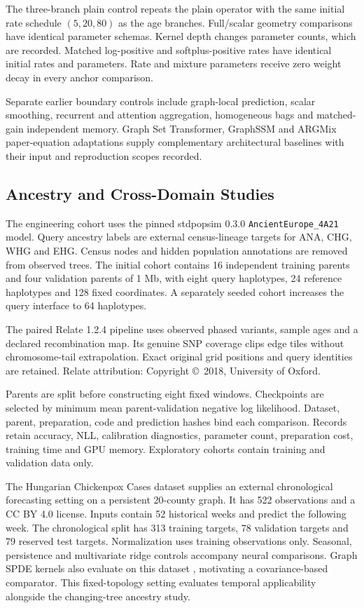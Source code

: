 \documentclass[letterpaper]{article}
\begin{document}
The three-branch plain control repeats the plain operator with the same initial rate schedule $(5,20,80)$ as the age branches. Full/scalar geometry comparisons have identical parameter schemas. Kernel depth changes parameter counts, which are recorded. Matched log-positive and softplus-positive rates have identical initial rates and parameters. Rate and mixture parameters receive zero weight decay in every anchor comparison.

Separate earlier boundary controls include graph-local prediction, scalar smoothing, recurrent and attention aggregation, homogeneous bags and matched-gain independent memory. Graph Set Transformer, GraphSSM and ARGMix paper-equation adaptations supply complementary architectural baselines with their input and reproduction scopes recorded.

\subsection{Ancestry and Cross-Domain Studies}
The engineering cohort uses the pinned stdpopsim 0.3.0 \texttt{AncientEurope\_4A21} model. Query ancestry labels are external census-lineage targets for ANA, CHG, WHG and EHG. Census nodes and hidden population annotations are removed from observed trees. The initial cohort contains 16 independent training parents and four validation parents of 1 Mb, with eight query haplotypes, 24 reference haplotypes and 128 fixed coordinates. A separately seeded cohort increases the query interface to 64 haplotypes.

The paired Relate 1.2.4 pipeline uses observed phased variants, sample ages and a declared recombination map. Its genuine SNP coverage clips edge tiles without chromosome-tail extrapolation. Exact original grid positions and query identities are retained. Relate attribution: Copyright \copyright\ 2018, University of Oxford.

Parents are split before constructing eight fixed windows. Checkpoints are selected by minimum mean parent-validation negative log likelihood. Dataset, parent, preparation, code and prediction hashes bind each comparison. Records retain accuracy, NLL, calibration diagnostics, parameter count, preparation cost, training time and GPU memory. Exploratory cohorts contain training and validation data only.

The Hungarian Chickenpox Cases dataset supplies an external chronological forecasting setting on a persistent 20-county graph. It has 522 observations and a CC BY 4.0 license. Inputs contain 52 historical weeks and predict the following week. The chronological split has 313 training targets, 78 validation targets and 79 reserved test targets. Normalization uses training observations only. Seasonal, persistence and multivariate ridge controls accompany neural comparisons. Graph SPDE kernels also evaluate on this dataset \citep{graphspde2022}, motivating a covariance-based comparator. This fixed-topology setting evaluates temporal applicability alongside the changing-tree ancestry study.


\end{document}
